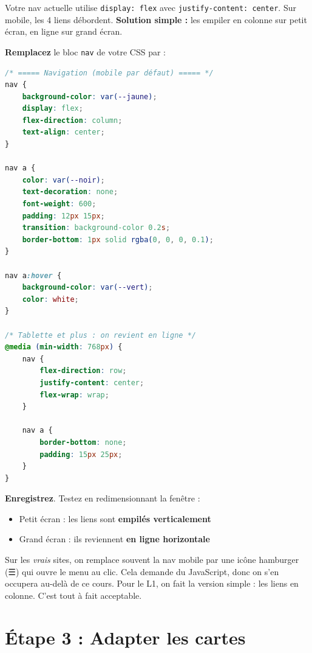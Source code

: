 \documentclass[11pt,a4paper]{article}
\newcommand{\cmark}{\ding{51}}
\begin{document}
Votre nav actuelle utilise \texttt{display: flex} avec
\texttt{justify-content: center}. Sur mobile, les 4 liens débordent.
\textbf{Solution simple :} les empiler en colonne sur petit écran, en
ligne sur grand écran.

\textbf{Remplacez} le bloc \texttt{nav} de votre CSS par :

\begin{lstlisting}[language=CSS]
/* ===== Navigation (mobile par défaut) ===== */
nav {
    background-color: var(--jaune);
    display: flex;
    flex-direction: column;
    text-align: center;
}

nav a {
    color: var(--noir);
    text-decoration: none;
    font-weight: 600;
    padding: 12px 15px;
    transition: background-color 0.2s;
    border-bottom: 1px solid rgba(0, 0, 0, 0.1);
}

nav a:hover {
    background-color: var(--vert);
    color: white;
}

/* Tablette et plus : on revient en ligne */
@media (min-width: 768px) {
    nav {
        flex-direction: row;
        justify-content: center;
        flex-wrap: wrap;
    }

    nav a {
        border-bottom: none;
        padding: 15px 25px;
    }
}
\end{lstlisting}

\textbf{Enregistrez}. Testez en redimensionnant la fenêtre :
\begin{itemize}[nosep]
    \item Petit écran : les liens sont \textbf{empilés verticalement}
    \item Grand écran : ils reviennent \textbf{en ligne horizontale}
\end{itemize}

\cmark

\begin{infobox}
Sur les \emph{vrais} sites, on remplace souvent la nav mobile par une
icône \og{}hamburger\fg{} (☰) qui ouvre le menu au clic. Cela demande du
JavaScript, donc on s'en occupera au-delà de ce cours. Pour le L1, on
fait la version simple : les liens en colonne. C'est tout à fait
acceptable.
\end{infobox}

\newpage

\section{Étape 3 : Adapter les cartes}
\end{document}
